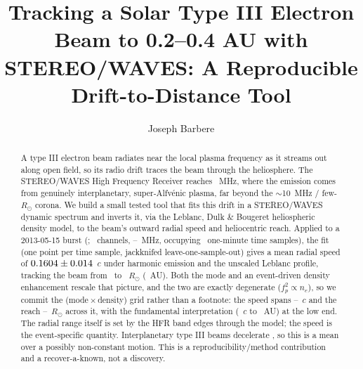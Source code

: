 \documentclass[twocolumn]{aastex631}
\newcommand{\code}[1]{\texttt{#1}}
\begin{document}
\title{Tracking a Solar Type III Electron Beam to 0.2--0.4 AU with STEREO/WAVES:
A Reproducible Drift-to-Distance Tool}

\author[0009-0008-3289-4447]{Joseph Barbere}

\begin{abstract}
A type III electron beam radiates near the local plasma frequency as it streams out along open field, so
its radio drift traces the beam through the heliosphere. The STEREO/WAVES \citep{bougeret2008} High
Frequency Receiver reaches \swRealFlo~MHz, where the emission comes from genuinely interplanetary,
super-Alfv\'enic plasma, far beyond the $\sim$10~MHz / few-$R_\odot$ corona. We build a small tested
tool that fits this drift in a STEREO/WAVES dynamic spectrum and inverts it, via the Leblanc, Dulk \&
Bougeret \citeyearpar{leblanc1998} heliospheric density model, to the beam's outward radial speed and
heliocentric reach. Applied to a 2013-05-15 burst (\code{\swSource}; \swRealNridge\ channels,
\swRealFlo--\swRealFhi~MHz, occupying \swRealNtimeCols\ one-minute time samples), the fit (one point per time sample, jackknifed leave-one-sample-out) gives a mean radial speed of
$0.1604\pm0.014$~$c$ under harmonic emission and the unscaled Leblanc profile,
tracking the beam from \swRealRlo\ to \swRealRhi~$R_\odot$ (\swRealRhiAU~AU). Both the mode and
an event-driven density enhancement rescale that picture, and the two are exactly degenerate
($f_p^2\propto n_e$), so we commit the (mode\,$\times$\,density) grid rather than a footnote:
the speed spans \swRealGridSpeedLo--\swRealGridSpeedHi~$c$ and the reach
\swRealGridReachLo--\swRealGridReachHi~$R_\odot$ across it, with the fundamental interpretation
(\swRealSpeedCFund~$c$ to \swRealRhiAUFund~AU) at the low end. The radial range itself is set by
the HFR band edges through the model; the speed is the event-specific quantity. Interplanetary
type III beams decelerate \citep{krupar2015}, so this is a mean over a possibly non-constant
motion. This is a reproducibility/method contribution and a recover-a-known, not a discovery.
\end{abstract}

\end{document}
